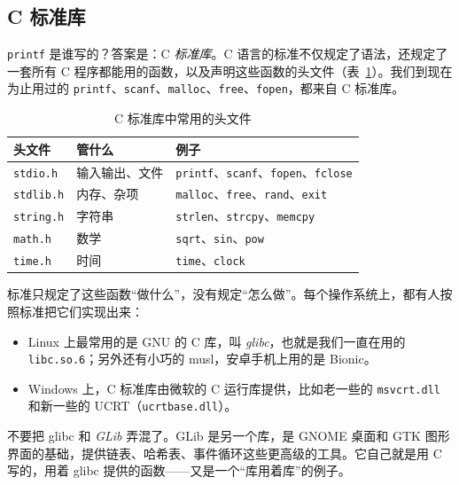 \subsection{C 标准库}

\texttt{printf} 是谁写的？答案是：C \emph{标准库}。C 语言的标准不仅规定了语法，还规定了一套所有 C 程序都能用的函数，以及声明这些函数的头文件（表~\ref{tab:libc}）。我们到现在为止用过的 \texttt{printf}、\texttt{scanf}、\texttt{malloc}、\texttt{free}、\texttt{fopen}，都来自 C 标准库。

\begin{table}[htbp]
  \centering
  \caption{C 标准库中常用的头文件}
  \label{tab:libc}
  \begin{tabular}{lll}
    \toprule
    头文件 & 管什么 & 例子 \\
    \midrule
    \texttt{stdio.h}  & 输入输出、文件 & \texttt{printf}、\texttt{scanf}、\texttt{fopen}、\texttt{fclose} \\
    \texttt{stdlib.h} & 内存、杂项     & \texttt{malloc}、\texttt{free}、\texttt{rand}、\texttt{exit} \\
    \texttt{string.h} & 字符串         & \texttt{strlen}、\texttt{strcpy}、\texttt{memcpy} \\
    \texttt{math.h}   & 数学           & \texttt{sqrt}、\texttt{sin}、\texttt{pow} \\
    \texttt{time.h}   & 时间           & \texttt{time}、\texttt{clock} \\
    \bottomrule
  \end{tabular}
\end{table}

标准只规定了这些函数“做什么”，没有规定“怎么做”。每个操作系统上，都有人按照标准把它们实现出来：
\begin{itemize}
  \item Linux 上最常用的是 GNU 的 C 库，叫 \emph{glibc}，也就是我们一直在用的 \texttt{libc.so.6}；另外还有小巧的 musl，安卓手机上用的是 Bionic。
  \item Windows 上，C 标准库由微软的 C 运行库提供，比如老一些的 \texttt{msvcrt.dll} 和新一些的 UCRT（\texttt{ucrtbase.dll}）。
\end{itemize}
不要把 glibc 和 \emph{GLib} 弄混了。GLib 是另一个库，是 GNOME 桌面和 GTK 图形界面的基础，提供链表、哈希表、事件循环这些更高级的工具。它自己就是用 C 写的，用着 glibc 提供的函数——又是一个“库用着库”的例子。

